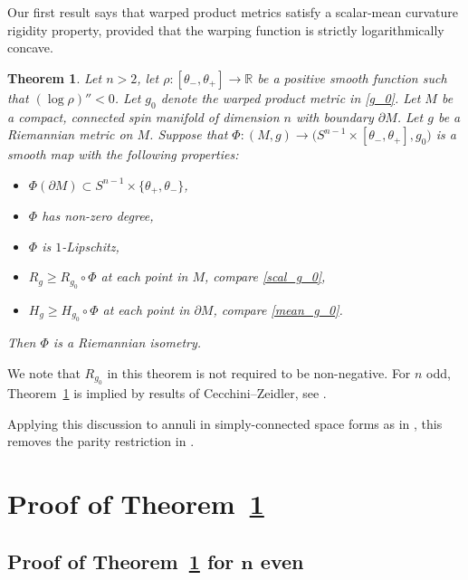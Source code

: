 \documentclass[11pt]{article}
\numberwithin{equation}{section}
\newtheorem{theorem}{Theorem} %
\numberwithin{equation}{section}
\newcommand{\R}{\mathbb{R}}
\begin{document}
Our first result says that warped product metrics satisfy a scalar-mean curvature rigidity property, provided that the warping function is strictly logarithmically concave.

\begin{theorem} \label{spherical_band}
Let $n>2$, let $\rho\colon [\theta_- , \theta_+] \to \R$ be a positive smooth function such that ${(\log \rho)''<0}$.
Let $g_0$ denote the warped product metric in \eqref{g_0}.
Let $M$ be a compact, connected spin manifold of dimension $n$ with boundary $\partial M$.
Let $g$ be a Riemannian metric on $M$.
Suppose that $\Phi\colon (M,g) \to \big(S^{n-1} \times [\theta_-,\theta_+],g_0\big)$ is a smooth map with the following properties:
\begin{itemize}\itemsep=0pt
\item $\Phi(\partial M) \subset S^{n-1} \times \{\theta_+,\theta_-\}$,
\item $\Phi$ has non-zero degree,
\item $\Phi$ is $1$-Lipschitz,
\item $R_g \geq R_{g_0} \circ \Phi$ at each point in $M$, compare \eqref{scal_g_0},
\item $H_g \geq H_{g_0} \circ \Phi$ at each point in $\partial M$, compare \eqref{mean_g_0}.
\end{itemize}
Then $\Phi$ is a Riemannian isometry.
\end{theorem}

We note that $R_{g_0}$ in this theorem is not required to be non-negative.
For $n$ odd, Theorem~\ref{spherical_band} is implied by results of Cecchini--Zeidler, see \cite[Theorem~10.2]{Cecchini-Zeidler}.

Applying this discussion to annuli in simply-connected space forms as in \cite[Section~10]{Cecchini-Zeidler}, this removes the parity restriction in \cite[Corollaries~10.4 and~10.5]{Cecchini-Zeidler}.



\section{Proof of Theorem~\ref{spherical_band}}\label{proof_of_band_comparison}

\subsection[Proof of Theorem~\ref{spherical_band} for n even]{Proof of Theorem~\ref{spherical_band} for $\boldsymbol{n}$ even}
\end{document}
